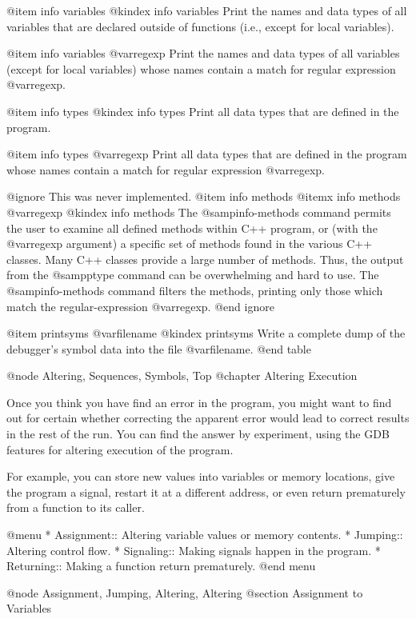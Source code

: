 @item info variables
@kindex info variables
Print the names and data types of all variables that are declared
outside of functions (i.e., except for local variables).

@item info variables @var{regexp}
Print the names and data types of all variables (except for local
variables) whose names contain a match for regular expression
@var{regexp}.

@item info types
@kindex info types
Print all data types that are defined in the program.

@item info types @var{regexp}
Print all data types that are defined in the program whose names
contain a match for regular expression @var{regexp}.

@ignore
This was never implemented.
@item info methods
@itemx info methods @var{regexp}
@kindex info methods
The @samp{info-methods} command permits the user to examine all defined
methods within C++ program, or (with the @var{regexp} argument) a
specific set of methods found in the various C++ classes.  Many
C++ classes provide a large number of methods.  Thus, the output
from the @samp{ptype} command can be overwhelming and hard to use.  The
@samp{info-methods} command filters the methods, printing only those
which match the regular-expression @var{regexp}.
@end ignore

@item printsyms @var{filename}
@kindex printsyms
Write a complete dump of the debugger's symbol data into the
file @var{filename}.
@end table

@node Altering, Sequences, Symbols, Top
@chapter Altering Execution

Once you think you have find an error in the program, you might want to
find out for certain whether correcting the apparent error would lead to
correct results in the rest of the run.  You can find the answer by
experiment, using the GDB features for altering execution of the
program.

For example, you can store new values into variables or memory
locations, give the program a signal, restart it at a different address,
or even return prematurely from a function to its caller.

@menu
* Assignment::    Altering variable values or memory contents.
* Jumping::       Altering control flow.
* Signaling::     Making signals happen in the program.
* Returning::     Making a function return prematurely.
@end menu

@node Assignment, Jumping, Altering, Altering
@section Assignment to Variables


